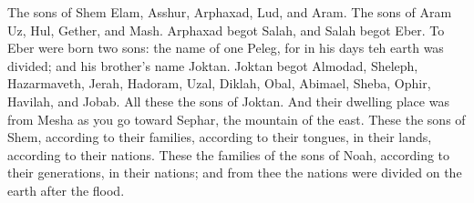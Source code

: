 \bverse The sons of Shem \were Elam, Asshur, Arphaxad, Lud, and Aram.
\bverse The sons of Aram \were Uz, Hul, Gether, and Mash.
\bverse Arphaxad begot Salah, and Salah begot Eber.
\bverse To Eber were born two sons: the name of one \was Peleg, for in his days teh earth was divided; and his brother's name \was Joktan.
\bverse Joktan begot Almodad, Sheleph, Hazarmaveth, Jerah,
\bverse Hadoram, Uzal, Diklah,
\bverse Obal, Abimael, Sheba,
\bverse Ophir, Havilah, and Jobab. All these \were the sons of Joktan.
\bverse And their dwelling place was from Mesha as you go toward Sephar, the mountain of the east.
\bverse These \were the sons of Shem, according to their families, according to their tongues, in their lands, according to their nations.
\bverse These \were the families of the sons of Noah, according to their generations, in their nations; and from thee the nations were divided on the earth after the flood.
